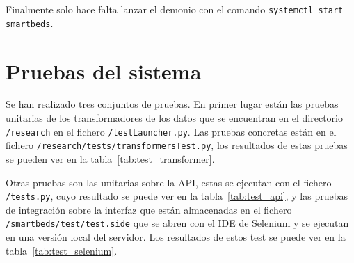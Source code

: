 Finalmente solo hace falta lanzar el demonio con el comando \texttt{systemctl start smartbeds}.

\section{Pruebas del sistema}

Se han realizado tres conjuntos de pruebas. En primer lugar están las pruebas unitarias de los transformadores de los datos que se encuentran en el directorio \texttt{/research} en el fichero \texttt{/testLauncher.py}. Las pruebas concretas están en el fichero \texttt{/research/tests/transformersTest.py}, los resultados de estas pruebas se pueden ver en la tabla~\ref{tab:test_transformer}.

Otras pruebas son las unitarias sobre la API, estas se ejecutan con el fichero \texttt{/tests.py}, cuyo resultado se puede ver en la tabla~\ref{tab:test_api}, y las pruebas de integración sobre la interfaz que están almacenadas en el fichero \texttt{/smartbeds/test/test.side} que se abren con el IDE de Selenium y se ejecutan en una versión local del servidor. Los resultados de estos test se puede ver en la tabla~\ref{tab:test_selenium}.

